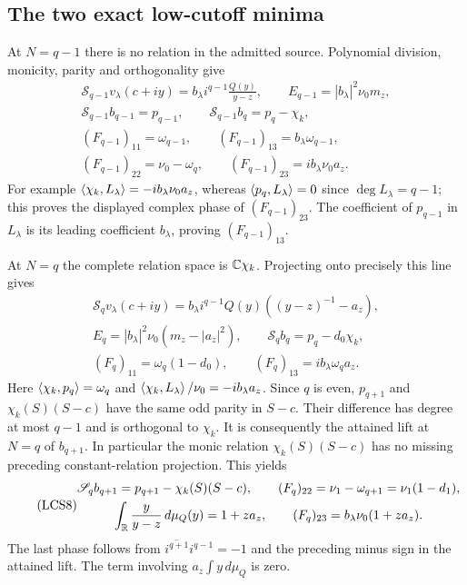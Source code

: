 \documentclass[11pt,a4paper]{article}
\begin{document}
\subsection{The two exact low-cutoff minima}

At $N=q-1$ there is no relation in the admitted source. Polynomial
division, monicity, parity and orthogonality give
\begin{equation}\tag{LCS6}
\begin{gathered}
 \mathscr S_{q-1}v_\lambda(c+iy)
        =b_\lambda i^{q-1}\frac{Q(y)}{y-z},\qquad
 E_{q-1}=|b_\lambda|^2\nu_0m_z,\\
 \mathscr S_{q-1}b_{q-1}=p_{q-1},\qquad
 \mathscr S_{q-1}b_q=p_q-\chi_k,\\
 (F_{q-1})_{11}=\omega_{q-1},\qquad
 (F_{q-1})_{13}=b_\lambda\omega_{q-1},\\
 (F_{q-1})_{22}=\nu_0-\omega_q,\qquad
 (F_{q-1})_{23}=i b_\lambda\nu_0a_z.
\end{gathered}
\end{equation}
For example $\left\langle\chi_k,L_\lambda\right\rangle=-i b_\lambda\nu_0a_z$,
whereas $\left\langle p_q,L_\lambda\right\rangle=0$ since $\deg L_\lambda=q-1$;
this proves the displayed complex phase of $(F_{q-1})_{23}$.
The coefficient of $p_{q-1}$ in $L_\lambda$ is its leading
coefficient $b_\lambda$, proving $(F_{q-1})_{13}$.

At $N=q$ the complete relation space is $\mathbb C\chi_k$. Projecting
onto precisely this line gives
\begin{equation}\tag{LCS7}
\begin{gathered}
 \mathscr S_qv_\lambda(c+iy)
   =b_\lambda i^{q-1}Q(y)\left((y-z)^{-1}-a_z\right),\\
 E_q=|b_\lambda|^2\nu_0(m_z-|a_z|^2),\qquad
 \mathscr S_qb_q=p_q-d_0\chi_k,\\
 (F_q)_{11}=\omega_q(1-d_0),\qquad
 (F_q)_{13}=i b_\lambda\omega_qa_z.
\end{gathered}
\end{equation}
Here $\left\langle\chi_k,p_q\right\rangle=\omega_q$ and
$\left\langle\chi_k,L_\lambda\right\rangle/\nu_0=-i b_\lambda a_z$.
Since $q$ is even, $p_{q+1}$ and $\chi_k(S)(S-c)$ have the same
odd parity in $S-c$. Their difference has degree at most $q-1$
and is orthogonal to $\chi_k$. It is consequently the attained
lift at $N=q$ of $b_{q+1}$. In particular the monic relation
$\chi_k(S)(S-c)$ has no missing preceding constant-relation
projection. This yields
\begin{equation}\tag{LCS8}
\begin{gathered}
 \mathscr S_qb_{q+1}=p_{q+1}-\chi_k(S)(S-c),\qquad
 (F_q)_{22}=\nu_1-\omega_{q+1}=\nu_1(1-d_1),\\
 \int_\mathbb R\frac{y}{y-z}\,d\mu_Q(y)=1+za_z,\qquad
 (F_q)_{23}=b_\lambda\nu_0(1+za_z).
\end{gathered}
\end{equation}
The last phase follows from
$\overline{i^{q+1}}i^{q-1}=-1$ and the preceding minus sign in
the attained lift. The term involving $a_z\int y\,d\mu_Q$ is zero.
\end{document}
